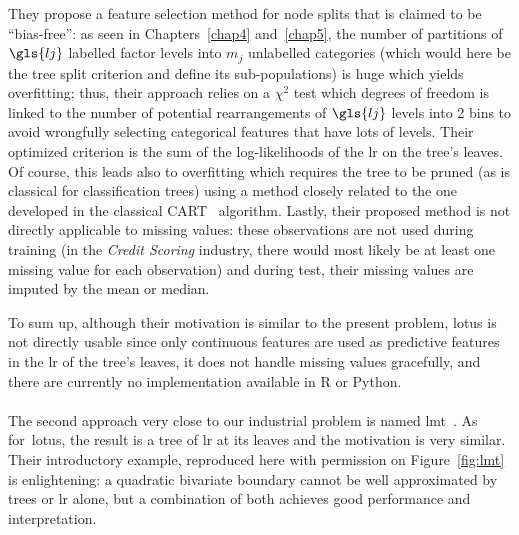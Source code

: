 They propose a feature selection method for node splits that is claimed to be ``bias-free'': as seen in Chapters~\ref{chap4} and~\ref{chap5}, the number of partitions of $\gls{lj}$ labelled factor levels into $m_j$ unlabelled categories (which would here be the tree split criterion and define its sub-populations) is huge which yields overfitting; thus, their approach relies on a $\chi^2$ test which degrees of freedom is linked to the number of potential rearrangements of $\gls{lj}$ levels into 2 bins to avoid wrongfully selecting categorical features that have lots of levels. Their optimized criterion is the sum of the log-likelihoods of the \gls{lr} on the tree's leaves. Of course, this leads also to overfitting which requires the tree to be pruned (as is classical for classification trees) using a method closely related to the one developed in the classical CART~\cite{cart84} algorithm. Lastly, their proposed method is not directly applicable to missing values: these observations are not used during training (in the \textit{Credit Scoring} industry, there would most likely be at least one missing value for each observation) and during test, their missing values are imputed by the mean or median.

To sum up, although their motivation is similar to the present problem, \gls{lotus} is not directly usable since only continuous features are used as predictive features in the \gls{lr} of the tree's leaves, it does not handle missing values gracefully, and there are currently no implementation available in \textsf{R} or Python.

\paragraph{}

The second approach very close to our industrial problem is named \gls{lmt}~\cite{landwehr2005logistic}. As for~\gls{lotus}, the result is a tree of \gls{lr} at its leaves and the motivation is very similar. Their introductory example, reproduced here with permission on Figure~\ref{fig:lmt} is enlightening: a quadratic bivariate boundary cannot be well approximated by trees or \gls{lr} alone, but a combination of both achieves good performance and interpretation.

